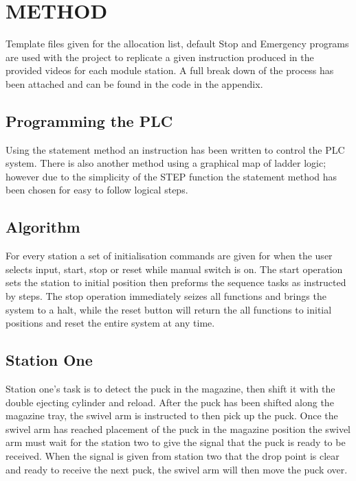\documentclass[a4paper, 10pt,  conference]{article}
\begin{document}

\section{METHOD}
Template files given for the allocation list, default Stop and Emergency programs are used with the project to replicate a given instruction produced in the provided videos for each module station. A full break down of the process has been attached and can be found in the code in the appendix.



\subsection{Programming the PLC}
Using the statement method an instruction has been written to control the PLC system. There is also another method using a graphical map of ladder logic; however due to the simplicity of the STEP function the statement method has been chosen for easy to follow logical steps.



\subsection{Algorithm}
For every station a set of initialisation commands are given for when the user selects input, start, stop or reset while manual switch is on. The start operation sets the station to initial position then preforms the sequence tasks as instructed by steps. The stop operation immediately seizes all functions and brings the system to a halt, while the reset button will return the all functions to initial positions and reset the entire system at any time. 



\subsection{Station One}

Station one's task is to detect the puck in the magazine, then shift it with the double ejecting cylinder and reload. After the puck has been shifted along the magazine tray, the swivel arm is instructed to then pick up the puck. Once the swivel arm has reached placement of the puck in the magazine position the swivel arm must wait for the station two to give the signal that the puck is ready to be received. When the signal is given from station two that the drop point is clear and ready to receive the next puck, the swivel arm will then move the puck over. 
\end{document}
